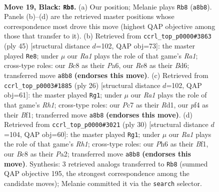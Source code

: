 \documentclass[11pt]{article}
\begin{document}
\clearpage

\begin{figure}[p]\centering
\begin{subfigure}{0.46\textwidth}\centering
\resizebox{\linewidth}{!}{%
\newchessgame
\chessboard[
  setfen={r1b1r1k1/p1p2pp1/2n2n1p/p1q4P/2P2P1R/2P1P3/8/R1BQKBN1 b Q - 1 19},
  showmover=false,
  pgfstyle=straightmove, color=movearrow, markmove={a8-b8}
]}
\caption{}
\end{subfigure}\hfill
\begin{subfigure}{0.46\textwidth}\centering
\resizebox{\linewidth}{!}{%
\newchessgame
\chessboard[
  setfen={r4k2/2p2pp1/p2b1n1r/1p1P3p/6qP/1B1R2P1/PBQ2PK1/4R3 b - - 1 23},
  showmover=false,
  pgfstyle=straightmove, color=movearrow, markmove={a8-e8}
]}
\caption{}
\end{subfigure}
\\[4pt]
\begin{subfigure}{0.46\textwidth}\centering
\resizebox{\linewidth}{!}{%
\newchessgame
\chessboard[
  setfen={r3k2r/1pqbbpp1/p2pp3/6Bn/3QP3/2N2P2/PPP4P/1K1R1B1R w kq - 0 14},
  showmover=false,
  pgfstyle=straightmove, color=movearrow, markmove={h1-g1}
]}
\caption{}
\end{subfigure}\hfill
\begin{subfigure}{0.46\textwidth}\centering
\resizebox{\linewidth}{!}{%
\newchessgame
\chessboard[
  setfen={r3k2r/1pqb1pp1/p2ppn2/8/3QP2P/2N2P2/PPP5/1K1R1B1R w kq - 0 16},
  showmover=false,
  pgfstyle=straightmove, color=movearrow, markmove={h1-g1}
]}
\caption{}
\end{subfigure}
\caption{\textbf{Move 19, Black: \texttt{Rb8}.} (a) Our position; Melanie plays \texttt{Rb8} (\texttt{a8b8}). Panels (b)--(d) are the retrieved master positions whose correspondence most drove this move (highest QAP objective among those that transfer to it). (b) Retrieved from \texttt{ccrl\_top\_p0000\#3863} (ply 45) [structural distance $d$=102, QAP obj=73]: the master played \texttt{Re8}; under $\mu$ our \emph{Ra1} plays the role of that game's \emph{Ra1}; cross-type roles: our \emph{B}c8 as their \emph{P}a6, our \emph{R}e8 as their \emph{B}d6; transferred move \texttt{a8b8} \textbf{(endorses this move)}. (c) Retrieved from \texttt{ccrl\_top\_p0003\#1885} (ply 26) [structural distance $d$=102, QAP obj=61]: the master played \texttt{Rg1}; under $\mu$ our \emph{Ra1} plays the role of that game's \emph{Rh1}; cross-type roles: our \emph{P}c7 as their \emph{R}d1, our \emph{p}f4 as their \emph{B}f1; transferred move \texttt{a8b8} \textbf{(endorses this move)}. (d) Retrieved from \texttt{ccrl\_top\_p0000\#3021} (ply 30) [structural distance $d$=104, QAP obj=60]: the master played \texttt{Rg1}; under $\mu$ our \emph{Ra1} plays the role of that game's \emph{Rh1}; cross-type roles: our \emph{P}h6 as their \emph{B}f1, our \emph{B}c8 as their \emph{P}a2; transferred move \texttt{a8b8} \textbf{(endorses this move)}. Synthesis: 3 retrieved analogs transferred to \texttt{Rb8} (summed QAP objective 195, the strongest correspondence among the candidate moves); Melanie committed it via the \texttt{search} selector.}
\label{fig:thought-m37}
\end{figure}
\end{document}
